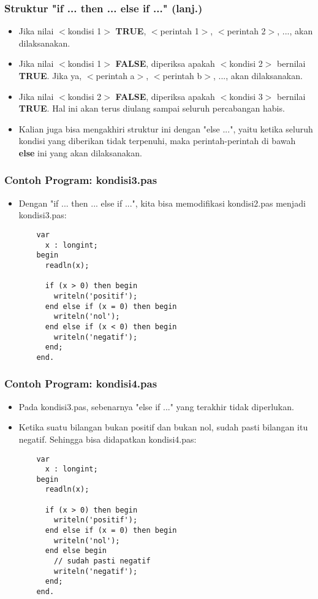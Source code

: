 \documentclass{beamer}
\begin{document}
\begin{frame}
\frametitle{Struktur "if ... then ... else if ..." (lanj.)}
\begin{itemize}
  \item Jika nilai $<$kondisi 1$>$ \textbf{TRUE}, $<$perintah 1$>$, $<$perintah 2$>$, ..., akan dilaksanakan.
  \item Jika nilai $<$kondisi 1$>$ \textbf{FALSE}, diperiksa apakah $<$kondisi 2$>$ bernilai \textbf{TRUE}. Jika ya, $<$perintah a$>$, $<$perintah b$>$, ..., akan dilaksanakan.
  \item Jika nilai $<$kondisi 2$>$ \textbf{FALSE}, diperiksa apakah $<$kondisi 3$>$ bernilai \textbf{TRUE}. Hal ini akan terus diulang sampai seluruh percabangan habis.
  \item Kalian juga bisa mengakhiri struktur ini dengan "else ...", yaitu ketika seluruh kondisi yang diberikan tidak terpenuhi, maka perintah-perintah di bawah \textbf{else} ini yang akan dilaksanakan.
\end{itemize}
\end{frame}

\begin{frame}[fragile]
\frametitle{Contoh Program: kondisi3.pas}
\begin{itemize}
  \item Dengan "if ... then ... else if ...", kita bisa memodifikasi kondisi2.pas menjadi kondisi3.pas:
  \begin{lstlisting}
    var
      x : longint;
    begin
      readln(x);

      if (x > 0) then begin
        writeln('positif');
      end else if (x = 0) then begin
        writeln('nol');
      end else if (x < 0) then begin
        writeln('negatif');
      end;
    end.
  \end{lstlisting}
\end{itemize}
\end{frame}

\begin{frame}[fragile]
\frametitle{Contoh Program: kondisi4.pas}
\begin{itemize}
  \item Pada kondisi3.pas, sebenarnya "else if ..." yang terakhir tidak diperlukan.
  \item Ketika suatu bilangan bukan positif dan bukan nol, sudah pasti bilangan itu negatif. Sehingga bisa didapatkan kondisi4.pas:
  \begin{lstlisting}
    var
      x : longint;
    begin
      readln(x);

      if (x > 0) then begin
        writeln('positif');
      end else if (x = 0) then begin
        writeln('nol');
      end else begin
        // sudah pasti negatif
        writeln('negatif');
      end;
    end.
  \end{lstlisting}
\end{itemize}
\end{frame}
\end{document}

